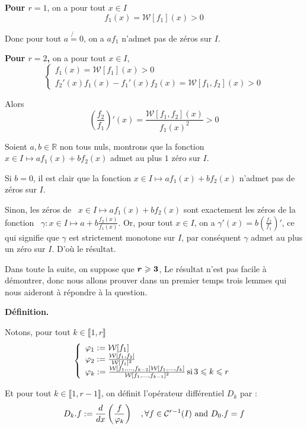 \textbf{Pour $r = 1$}, on a pour tout $x \in I$
\[ f_1 (x) =\mathcal{W} [f_1] (x) > 0 \]


Donc pour tout $a \not{=} 0$, on a $a f_1$ n'admet pas de z{\'e}ros sur $I$.

\textbf{Pour $r = 2$,} on a pour tout $x \in I$,
\[ \left\{\begin{array}{l}
     f_1 (x) =\mathcal{W} [f_1] (x) > 0\\
     f_2' (x) f_1 (x) - f_1' (x) f_2 (x) =\mathcal{W} [f_1, f_2] (x) > 0
   \end{array}\right. \]

Alors
\[ \left( \frac{f_2}{f_1} \right)' (x) = \frac{\mathcal{W} [f_1, f_2] (x)}{f_1
   (x)^2} > 0 \]


Soient $a, b \in \mathbb{R}$ non tous nuls, montrons que la fonction $x \in I
\longmapsto a f_1 (x) + b f_2 (x)$ admet au plus $1$ z{\'e}ro sur $I$.

Si $b = 0$, il est clair que la fonction $x \in I \longmapsto a f_1 (x) + b
f_2 (x)$ n'admet pas de z{\'e}ros sur $I$.

Sinon, les z{\'e}ros de \ $x \in I \longmapsto a f_1 (x) + b f_2 (x)$ sont
exactement les z{\'e}ros de la fonction \ $\gamma : x \in I \longmapsto a + b
\frac{f_2 (x)}{f_1 (x)}$. Or, pour tout $x \in I$, on a $\gamma' (x) = b
\left( \frac{f_2}{f_1} \right)'$, ce qui signifie que $\gamma$ est strictement
monotone sur $I$, par cons{\'e}quent $\gamma$ admet au plus un z{\'e}ro sur
$I$. D'o{\`u} le r{\'e}sultat.

Dans toute la suite, on suppose que $\boldsymbol{r \geqslant 3}$, Le
r{\'e}sultat n'est pas facile {\`a} d{\'e}montrer, donc nous allons prouver
dans un premier temps trois lemmes qui nous aideront {\`a} r{\'e}pondre {\`a}
la question.

\textbf{D{\'e}finition.}

Notons, pour tout $k \in \llbracket 1, r \rrbracket$
\[ \left\{\begin{array}{l}
     \varphi_1 := \mathcal{W} [f_1]\\
     \varphi_2 := \frac{\mathcal{W} [f_1, f_2]}{\mathcal{W} [f_1]^2}\\
     \varphi_k := \frac{\mathcal{W} [f_1, \ldots, f_{k - 2}] \mathcal{W}
     [f_1, \ldots, f_k]}{\mathcal{W} [f_1, \ldots, f_{k - 1}]^2} \operatorname{si} 3
     \leqslant k \leqslant r
   \end{array}\right. \]

Et pour tout $k \in \llbracket 1, r - 1 \rrbracket$, on d{\'e}finit
l'op{\'e}rateur diff{\'e}rentiel $D_k$ par :
\[ D_k .f := \frac{d}{d x} \left( \frac{f}{\varphi_k} \right) \quad,
   \forall f \in \mathcal{C}^{r - 1} (I) \text{ and } D_0 .f = f \]


